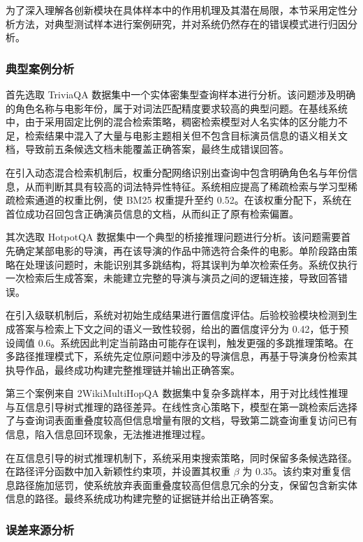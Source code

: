 为了深入理解各创新模块在具体样本中的作用机理及其潜在局限，本节采用定性分析方法，对典型测试样本进行案例研究，并对系统仍然存在的错误模式进行归因分析。

\subsubsection{典型案例分析}

首先选取 TriviaQA 数据集中一个实体密集型查询样本进行分析。该问题涉及明确的角色名称与电影年份，属于对词法匹配精度要求较高的典型问题。在基线系统中，由于采用固定比例的混合检索策略，稠密检索模型对人名实体的区分能力不足，检索结果中混入了大量与电影主题相关但不包含目标演员信息的语义相关文档，导致前五条候选文档未能覆盖正确答案，最终生成错误回答。

在引入动态混合检索机制后，权重分配网络识别出查询中包含明确角色名与年份信息，从而判断其具有较高的词法特异性特征。系统相应提高了稀疏检索与学习型稀疏检索通道的权重比例，使 BM25 权重提升至约 0.52。在该权重分配下，系统在首位成功召回包含正确演员信息的文档，从而纠正了原有检索偏置。

其次选取 HotpotQA 数据集中一个典型的桥接推理问题进行分析。该问题需要首先确定某部电影的导演，再在该导演的作品中筛选符合条件的电影。单阶段路由策略在处理该问题时，未能识别其多跳结构，将其误判为单次检索任务。系统仅执行一次检索后生成答案，未能建立完整的导演与演员之间的逻辑连接，导致回答错误。

在引入级联机制后，系统对初始生成结果进行置信度评估。后验校验模块检测到生成答案与检索上下文之间的语义一致性较弱，给出的置信度评分为 0.42，低于预设阈值 0.6。系统因此判定当前路由可能存在误判，触发更强的多跳推理策略。在多路径推理模式下，系统先定位原问题中涉及的导演信息，再基于导演身份检索其执导作品，最终成功构建完整推理链并输出正确答案。

第三个案例来自 2WikiMultiHopQA 数据集中复杂多跳样本，用于对比线性推理与互信息引导树式推理的路径差异。在线性贪心策略下，模型在第一跳检索后选择了与查询词表面重叠度较高但信息增量有限的文档，导致第二跳查询重复访问已有信息，陷入信息回环现象，无法推进推理过程。

在互信息引导的树式推理机制下，系统采用束搜索策略，同时保留多条候选路径。在路径评分函数中加入新颖性约束项，并设置其权重 $\beta$ 为 0.35。该约束对重复信息路径施加惩罚，使系统放弃表面重叠度较高但信息冗余的分支，保留包含新实体信息的路径。最终系统成功构建完整的证据链并给出正确答案。


\subsubsection{误差来源分析}

